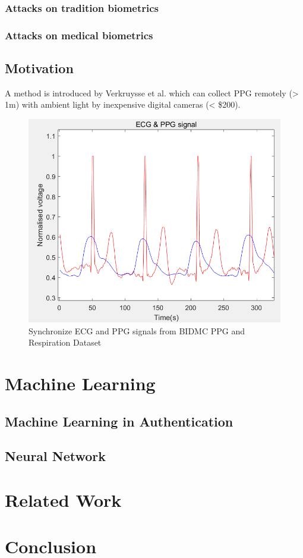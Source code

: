 \documentclass[a4paper,12pt]{article}
\begin{document}
\subsubsection{Attacks on tradition biometrics}

\subsubsection{Attacks on medical biometrics}

\subsection{Motivation}
A method is introduced by Verkruysse et al. which can collect PPG remotely (> 1m) with ambient light by inexpensive digital cameras (< \$200)\parencite{Verkruysse2008remotePPG}.

\begin{figure}[H]
\centering
\includegraphics[width = .8\textwidth]{ecg_ppg.PNG}
\caption{Synchronize ECG and PPG signals from BIDMC PPG and Respiration Dataset\autocite{PhysioNet}}

\label{fig:ppg_ecg}
\end{figure}

\section{Machine Learning}
\subsection{Machine Learning in Authentication}
\subsection{Neural Network}

\section{Related Work}

\section{Conclusion}

\printbibliography
\end{document}

